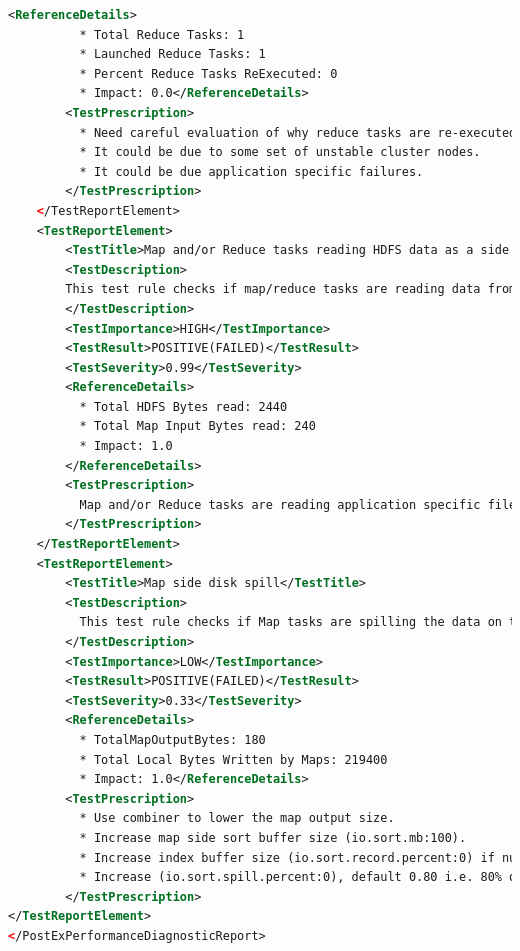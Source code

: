 \begin{lstlisting}[language=XML]
        <ReferenceDetails>
          * Total Reduce Tasks: 1
          * Launched Reduce Tasks: 1
          * Percent Reduce Tasks ReExecuted: 0
          * Impact: 0.0</ReferenceDetails>
        <TestPrescription>
          * Need careful evaluation of why reduce tasks are re-executed.
          * It could be due to some set of unstable cluster nodes.
          * It could be due application specific failures.
        </TestPrescription>
    </TestReportElement>
    <TestReportElement>
        <TestTitle>Map and/or Reduce tasks reading HDFS data as a side effect</TestTitle>
        <TestDescription>
        This test rule checks if map/reduce tasks are reading data from HDFS as a side effect. More the data read as a side effect can potentially be a bottleneck across parallel execution of map/reduce tasks.
        </TestDescription>
        <TestImportance>HIGH</TestImportance>
        <TestResult>POSITIVE(FAILED)</TestResult>
        <TestSeverity>0.99</TestSeverity>
        <ReferenceDetails>
          * Total HDFS Bytes read: 2440
          * Total Map Input Bytes read: 240
          * Impact: 1.0
        </ReferenceDetails>
        <TestPrescription>
          Map and/or Reduce tasks are reading application specific files from HDFS. Make sure the replication factor of these HDFS files is high enough to avoid the data reading bottleneck. Typically replication factor can be square root of map/reduce tasks capacity of the allocated cluster.
        </TestPrescription>
    </TestReportElement>
    <TestReportElement>
        <TestTitle>Map side disk spill</TestTitle>
        <TestDescription>
          This test rule checks if Map tasks are spilling the data on to the local disk during the map side sorting due to insufficient sort buffer size. The impact is calculated as ratio between local bytes written to map output bytes. Impact is normalized using NormalizationFactor given below and any value greater than or equal to normalization factor is treated as maximum (i.e. 1).
        </TestDescription>
        <TestImportance>LOW</TestImportance>
        <TestResult>POSITIVE(FAILED)</TestResult>
        <TestSeverity>0.33</TestSeverity>
        <ReferenceDetails>
          * TotalMapOutputBytes: 180
          * Total Local Bytes Written by Maps: 219400
          * Impact: 1.0</ReferenceDetails>
        <TestPrescription>
          * Use combiner to lower the map output size.
          * Increase map side sort buffer size (io.sort.mb:100).
          * Increase index buffer size (io.sort.record.percent:0) if number of Map Output Records are large.
          * Increase (io.sort.spill.percent:0), default 0.80 i.e. 80% of sort buffer size and index buffer size.
        </TestPrescription>
</TestReportElement>
</PostExPerformanceDiagnosticReport>
\end{lstlisting}
